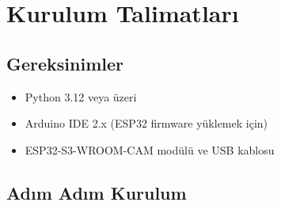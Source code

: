 \appendix

\section{Kurulum Talimatları}
\label{ek:kurulum}

\subsection*{Gereksinimler}

\begin{itemize}
  \item Python 3.12 veya üzeri
  \item Arduino IDE 2.x (ESP32 firmware yüklemek için)
  \item ESP32-S3-WROOM-CAM modülü ve USB kablosu
\end{itemize}

\subsection*{Adım Adım Kurulum}

